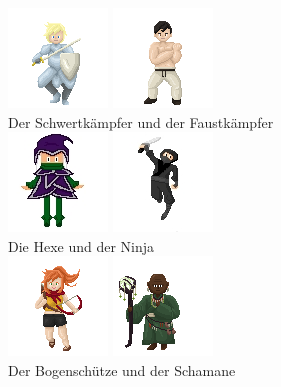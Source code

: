 \documentclass[10pt,a4paper,notitlepage]{report}
\begin{document}
\begin{flushleft}
\begin{center}
	\includegraphics[scale=2]{Schwertkaempfer.png}
	\includegraphics[scale=2]{Faustkaempfer.png}\\
	Der Schwertkämpfer und der Faustkämpfer\\
	
	\includegraphics[scale=2]{Hexe}
	\includegraphics[scale=2]{Ninja}\\
	Die Hexe und der Ninja\\
	
	\includegraphics[scale=2]{Bogenschuetze}
	\includegraphics[scale=2]{Schamane}\\
	Der Bogenschütze und der Schamane\\

	\end{center}

\end{flushleft}
\end{document}
